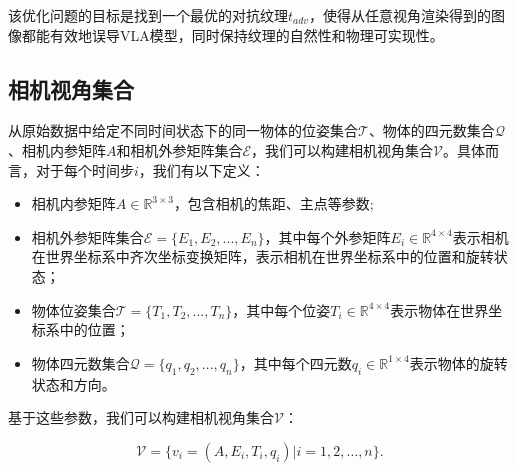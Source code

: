 该优化问题的目标是找到一个最优的对抗纹理$t_{adv}$，使得从任意视角渲染得到的图像都能有效地误导VLA模型，同时保持纹理的自然性和物理可实现性。

\subsection{相机视角集合}

从原始数据中给定不同时间状态下的同一物体的位姿集合$\mathcal{T}$、物体的四元数集合$\mathcal{Q}$、相机内参矩阵$A$和相机外参矩阵集合$\mathcal{E}$，我们可以构建相机视角集合$\mathcal{V}$。具体而言，对于每个时间步$i$，我们有以下定义：

\begin{itemize}
    \item 相机内参矩阵$A \in \mathbb{R}^{3 \times 3}$，包含相机的焦距、主点等参数;
    \item 相机外参矩阵集合$\mathcal{E} = \{E_1, E_2, ..., E_n\}$，其中每个外参矩阵$E_i \in \mathbb{R}^{4 \times 4}$表示相机在世界坐标系中齐次坐标变换矩阵，表示相机在世界坐标系中的位置和旋转状态；
    \item 物体位姿集合$\mathcal{T} = \{T_1, T_2, ..., T_n\}$，其中每个位姿$T_i \in \mathbb{R}^{4 \times 4}$表示物体在世界坐标系中的位置；
    \item 物体四元数集合$\mathcal{Q} = \{q_1, q_2, ..., q_n\}$，其中每个四元数$q_i \in \mathbb{R}^{1 \times 4}$表示物体的旋转状态和方向。
\end{itemize}
 
基于这些参数，我们可以构建相机视角集合$\mathcal{V}$：

\begin{equation}
    \mathcal{V} = \{v_i = (A, E_i, T_i, q_i) | i = 1,2,\dots,n\}.
\end{equation}



